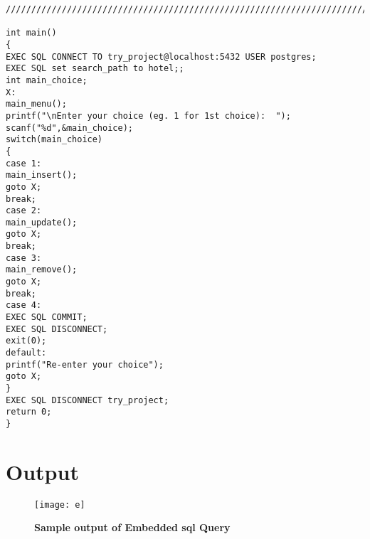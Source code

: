 \documentclass[a4,12pt]{report}
\begin{document}
\begin{lstlisting}
///////////////////////////////////////////////////////////////////////////////////////////////////////////////////////////////////////////

int main()
{
EXEC SQL CONNECT TO try_project@localhost:5432 USER postgres;
EXEC SQL set search_path to hotel;;
int main_choice;
X:
main_menu();
printf("\nEnter your choice (eg. 1 for 1st choice):  ");
scanf("%d",&main_choice);
switch(main_choice)
{
case 1:
main_insert();
goto X;
break;
case 2:
main_update();
goto X;
break;
case 3:
main_remove();
goto X;
break;
case 4:
EXEC SQL COMMIT;
EXEC SQL DISCONNECT;
exit(0);
default:
printf("Re-enter your choice");
goto X;
}
EXEC SQL DISCONNECT try_project;
return 0;
}

\end{lstlisting}





\section*{ Output }

\begin{figure}[hbtp]
\centering
\texttt{[image: e]}
\caption{\textbf{{\color{red} Sample output of Embedded sql Query}}}
\end{figure}
\end{document}
